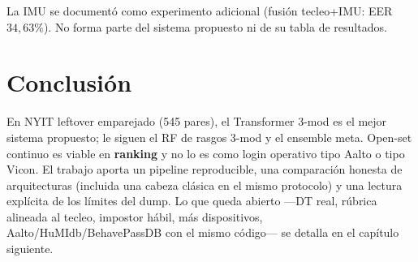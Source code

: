 La IMU se documentó como experimento adicional (fusión tecleo+IMU: EER $34{,}63\%$). No forma parte del
sistema propuesto ni de su tabla de resultados.

\section{Conclusión}

En NYIT leftover emparejado (545 pares), el Transformer 3-mod es el mejor sistema propuesto; le siguen
el RF de rasgos 3-mod y el ensemble meta. Open-set continuo es viable en \textbf{ranking} y no lo es como login
operativo tipo Aalto o tipo Vicon. El trabajo aporta un pipeline reproducible, una comparación honesta
de arquitecturas (incluida una cabeza clásica en el mismo protocolo) y una lectura explícita de los
límites del dump. Lo que queda abierto ---DT real, rúbrica alineada al tecleo, impostor hábil, más dispositivos,
Aalto/HuMIdb/BehavePassDB con el mismo código--- se detalla en el capítulo siguiente.
